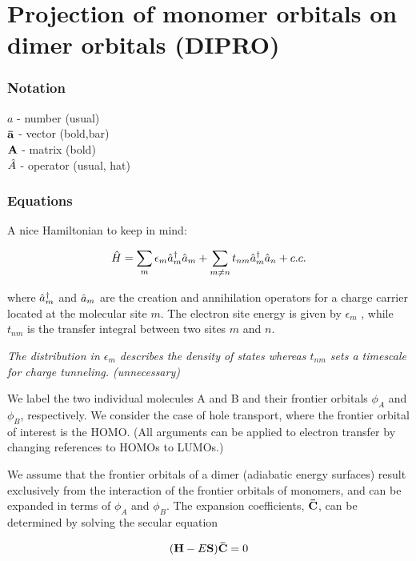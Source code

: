 \section{
Projection of monomer orbitals on dimer orbitals (DIPRO)
}\label{sec:idft}


\subsubsection{Notation}
$a$ - number (usual)\\
$\mathbf{ \bar{a} }$ - vector  (bold,bar)\\
$\mathbf{ A }$ - matrix (bold)\\
$\hat{ A }$ - operator (usual, hat)

\subsubsection{Equations}

A nice Hamiltonian to keep in mind:

\begin{equation}
  \hat{ H } = 
  \sum_m \epsilon_m \hat{ a }_m^\dagger \hat{ a }_m +
  \sum_{m \neq n} t_{nm} \hat{ a }_m^\dagger \hat{ a }_n + c.c.
  \label{eq:dipro_eq1}
\end{equation}

where $\hat{ a }_m^\dagger$ and $\hat{ a }_m$ are the creation and annihilation operators
for a charge carrier located at the molecular site $m$.
The electron site energy is given by $\epsilon_m$ , while $t_{nm}$ 
is the transfer integral between two sites $m$ and $n$. 

\textit{
The distribution in $\epsilon_m$
describes the density of states whereas $t_{nm}$ sets a timescale for
charge tunneling. (unnecessary)
}


We label the two individual molecules A
and B and their frontier orbitals $\phi_A$ and $\phi_B$, respectively.
We consider the  case
of hole transport, where the frontier orbital of interest is
the HOMO. (All arguments can be applied to electron transfer
by changing references to HOMOs to LUMOs.) 

We assume that the frontier orbitals of a dimer (adiabatic
energy surfaces) result exclusively from the interaction of the
frontier orbitals of monomers, and
can be expanded in terms of $\phi_A$ and $\phi_B$. The expansion
coefficients, $\mathbf{ \bar{C} }$, can be determined by solving the
secular equation

\begin{equation}
  (\mathbf{ H } - E \mathbf{ S })\mathbf{ \bar{C} } = 0
  \label{eq:dipro_eq2}
\end{equation}

